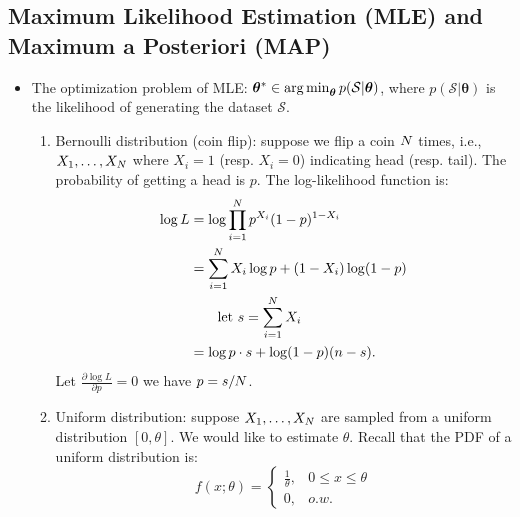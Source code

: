 \subsection{Maximum Likelihood Estimation (MLE) and Maximum a Posteriori (MAP)}
    \begin{itemize}
        \item The optimization problem of MLE: $\bm{\theta}^\ast \in  \operatorname{arg\,min}_{\bm{\theta}} p(\mathcal{S} | \bm{\theta})$, where $p(\mathcal{S}| \bm{\theta})$ is the likelihood of generating the dataset $\mathcal{S}$.
            \begin{enumerate}
                \item Bernoulli distribution (coin flip): suppose we flip a coin $N$ times, i.e., $X_1, \ldots, X_N$ where $X_i=1$ (resp. $X_i=0$) indicating head (resp. tail).
                The probability of getting a head is $p$.
                The log-likelihood function is:
                    \begin{equation}
                        \begin{aligned}
                            \log L & = \log \prod_{i=1}^{N}{
                            p^{X_i} (1-p)^{1-X_i} } \\
                            & = \sum_{i=1}^{N}{X_i \log p + (1-X_i) \log(1-p)} \\
                            & \quad \quad \text{let $s = \sum_{i=1}^{N}{X_i}$} \\
                            & = \log p \cdot s + \log (1-p) (n-s).
                        \end{aligned}
                    \end{equation}
                Let $\frac{\partial \log L}{\partial p} =0$ we have $p = s / N$.
                \item Uniform distribution: suppose $X_1, \ldots, X_N$ are sampled from a uniform distribution $[0, \theta]$.
                We would like to estimate $\theta$.
                Recall that the PDF of a uniform distribution is:
                    \begin{equation}
                        f(x; \theta) = \begin{cases}
                            \frac{1}{\theta}, & 0 \le x \le \theta \\
                            0, & o.w.
                        \end{cases}
                    \end{equation}   

\end{enumerate}
\end{itemize}
